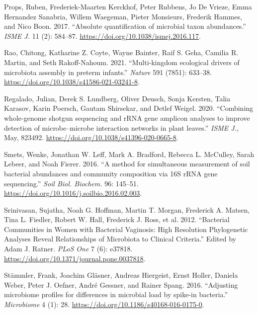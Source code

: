 \documentclass[
]{article}
\newlength{\cslhangindent}
\newlength{\cslentryspacingunit} %
\newenvironment{CSLReferences}[2] %
 {%
  \setlength{\parindent}{0pt}
  \ifodd #1
  \let\oldpar\par
  \def\par{\hangindent=\cslhangindent\oldpar}
  \fi
  \setlength{\parskip}{#2\cslentryspacingunit}
 }%
 {}
\begin{document}
\begin{CSLReferences}{1}{0}
\leavevmode{}%
Props, Ruben, Frederiek-Maarten Kerckhof, Peter Rubbens, Jo De Vrieze, Emma Hernandez Sanabria, Willem Waegeman, Pieter Monsieurs, Frederik Hammes, and Nico Boon. 2017. {``{Absolute quantification of microbial taxon abundances}.''} \emph{ISME J.} 11 (2): 584--87. \url{https://doi.org/10.1038/ismej.2016.117}.

\leavevmode{}%
Rao, Chitong, Katharine Z. Coyte, Wayne Bainter, Raif S. Geha, Camilia R. Martin, and Seth Rakoff-Nahoum. 2021. {``{Multi-kingdom ecological drivers of microbiota assembly in preterm infants}.''} \emph{Nature} 591 (7851): 633--38. \url{https://doi.org/10.1038/s41586-021-03241-8}.

\leavevmode{}%
Regalado, Julian, Derek S. Lundberg, Oliver Deusch, Sonja Kersten, Talia Karasov, Karin Poersch, Gautam Shirsekar, and Detlef Weigel. 2020. {``{Combining whole-genome shotgun sequencing and rRNA gene amplicon analyses to improve detection of microbe--microbe interaction networks in plant leaves}.''} \emph{ISME J.}, May, 823492. \url{https://doi.org/10.1038/s41396-020-0665-8}.

\leavevmode{}%
Smets, Wenke, Jonathan W. Leff, Mark A. Bradford, Rebecca L. McCulley, Sarah Lebeer, and Noah Fierer. 2016. {``{A method for simultaneous measurement of soil bacterial abundances and community composition via 16S rRNA gene sequencing}.''} \emph{Soil Biol. Biochem.} 96: 145--51. \url{https://doi.org/10.1016/j.soilbio.2016.02.003}.

\leavevmode{}%
Srinivasan, Sujatha, Noah G. Hoffman, Martin T. Morgan, Frederick A. Matsen, Tina L. Fiedler, Robert W. Hall, Frederick J. Ross, et al. 2012. {``{Bacterial Communities in Women with Bacterial Vaginosis: High Resolution Phylogenetic Analyses Reveal Relationships of Microbiota to Clinical Criteria}.''} Edited by Adam J. Ratner. \emph{PLoS One} 7 (6): e37818. \url{https://doi.org/10.1371/journal.pone.0037818}.

\leavevmode{}%
Stämmler, Frank, Joachim Gläsner, Andreas Hiergeist, Ernst Holler, Daniela Weber, Peter J. Oefner, André Gessner, and Rainer Spang. 2016. {``{Adjusting microbiome profiles for differences in microbial load by spike-in bacteria}.''} \emph{Microbiome} 4 (1): 28. \url{https://doi.org/10.1186/s40168-016-0175-0}.


\end{CSLReferences}
\end{document}
